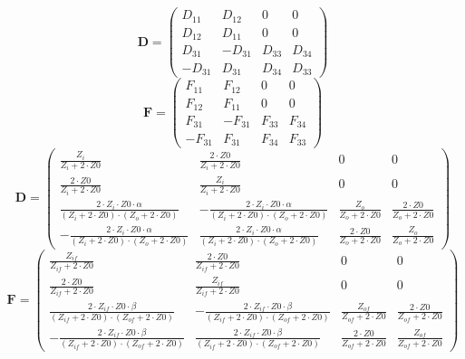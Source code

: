 \[ \mathbf{D}=\left(\begin{smallmatrix} D_{11} & D_{12} & 0 & 0 \\
D_{12} & D_{11} & 0 & 0 \\ D_{31} & -D_{31} & D_{33} & D_{34} \\
-D_{31} & D_{31} & D_{34} & D_{33} \end{smallmatrix}\right) \]
\[ \mathbf{F}=\left(\begin{smallmatrix} F_{11} & F_{12} & 0 & 0 \\
F_{12} & F_{11} & 0 & 0 \\ F_{31} & -F_{31} & F_{33} & F_{34} \\
-F_{31} & F_{31} & F_{34} & F_{33} \end{smallmatrix}\right) \]
\[ \mathbf{D}=\left(\begin{smallmatrix} \frac{Z_i}{Z_i+2\cdot Z0} &
\frac{2\cdot Z0}{Z_i+2\cdot Z0} & 0 & 0 \\ \frac{2\cdot Z0}{Z_i+2\cdot
Z0} & \frac{Z_i}{Z_i+2\cdot Z0} & 0 & 0 \\ \frac{2\cdot Z_i\cdot
Z0\cdot \alpha}{\left(Z_i+2\cdot Z0\right)\cdot\left(Z_o+2\cdot
Z0\right)} & -\frac{2\cdot Z_i\cdot Z0\cdot \alpha}{\left(Z_i+2\cdot
Z0\right)\cdot\left(Z_o+2\cdot Z0\right)} & \frac{Z_o}{Z_o+2\cdot Z0}
& \frac{2\cdot Z0}{Z_o+2\cdot Z0} \\ -\frac{2\cdot Z_i\cdot Z0\cdot
\alpha}{\left(Z_i+2\cdot Z0\right)\cdot\left(Z_o+2\cdot Z0\right)} &
\frac{2\cdot Z_i\cdot Z0\cdot \alpha}{\left(Z_i+2\cdot
Z0\right)\cdot\left(Z_o+2\cdot Z0\right)} & \frac{2\cdot
Z0}{Z_o+2\cdot Z0} & \frac{Z_o}{Z_o+2\cdot Z0}
\end{smallmatrix}\right) \]
\[ \mathbf{F}=\left(\begin{smallmatrix} \frac{Z_{if}}{Z_{if}+2\cdot
Z0} & \frac{2\cdot Z0}{Z_{if}+2\cdot Z0} & 0 & 0 \\ \frac{2\cdot
Z0}{Z_{if}+2\cdot Z0} & \frac{Z_{if}}{Z_{if}+2\cdot Z0} & 0 & 0 \\
\frac{2\cdot Z_{if}\cdot Z0\cdot \beta}{\left(Z_{if}+2\cdot
Z0\right)\cdot\left(Z_{of}+2\cdot Z0\right)} & -\frac{2\cdot
Z_{if}\cdot Z0\cdot \beta}{\left(Z_{if}+2\cdot
Z0\right)\cdot\left(Z_{of}+2\cdot Z0\right)} &
\frac{Z_{of}}{Z_{of}+2\cdot Z0} & \frac{2\cdot Z0}{Z_{of}+2\cdot Z0}
\\ -\frac{2\cdot Z_{if}\cdot Z0\cdot \beta}{\left(Z_{if}+2\cdot
Z0\right)\cdot\left(Z_{of}+2\cdot Z0\right)} & \frac{2\cdot
Z_{if}\cdot Z0\cdot \beta}{\left(Z_{if}+2\cdot
Z0\right)\cdot\left(Z_{of}+2\cdot Z0\right)} & \frac{2\cdot
Z0}{Z_{of}+2\cdot Z0} & \frac{Z_{of}}{Z_{of}+2\cdot Z0}
\end{smallmatrix}\right) \]
